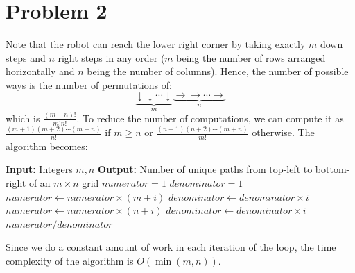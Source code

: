 \documentclass{article}
\begin{document}
\section{Problem 2}
  Note that the robot can reach the lower right corner by taking exactly $m$ down steps and $n$ right steps in any order ($m$ being the number of rows arranged horizontally and $n$ being the number of columns).
  Hence, the number of possible ways is the number of permutations of:
  \[ \underbrace{\downarrow \downarrow \cdots \downarrow}_{m} \underbrace{\rightarrow \rightarrow \cdots \rightarrow}_{n} \]
  which is $\frac{(m+n)!}{m!n!}$.
  To reduce the number of computations, we can compute it as $\frac{(m+1)(m+2) \cdots (m+n)}{n!}$ if $m \ge n$ or $\frac{(n+1)(n+2) \cdots (m+n)}{m!}$ otherwise.
  The algorithm becomes:
  \begin{algorithm}[H]
    \caption{Number of Paths}
    \begin{algorithmic}[1]
      \State \textbf{Input:} Integers $m, n$
      \State \textbf{Output:} Number of unique paths from top-left to bottom-right of an $m \times n$ grid
      \State $numerator = 1$
      \State $denominator = 1$
          \State $numerator \gets numerator \times (m + i)$
          \State $denominator \gets denominator \times i$
        \EndFor
      \Else
          \State $numerator \gets numerator \times (n + i)$
          \State $denominator \gets denominator \times i$
        \EndFor
      \EndIf
      \State \Return $numerator / denominator$
    \end{algorithmic}
  \end{algorithm}

  Since we do a constant amount of work in each iteration of the loop, the time complexity of the algorithm is $O(\min(m, n))$.
\end{document}
